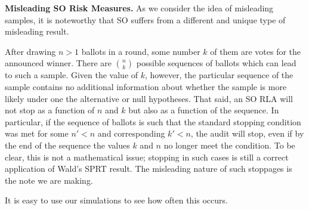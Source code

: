 \textbf{Misleading SO Risk Measures.} As we consider the idea of misleading samples, it is noteworthy that SO \BRAVO suffers from a different and unique type of misleading result. 

After drawing $n>1$ ballots in a round, some number $k$ of them are votes for the announced winner. There are $\binom{n}{k}$ possible sequences of ballots which can lead to such a sample. Given the value of $k$, however, the particular sequence of the sample contains no additional information about whether the sample is more likely under one the alternative or null hypotheses.
That said, an SO \BRAVO RLA will not stop as a function of $n$ and $k$ but also as a function of the sequence. In particular, if the sequence of ballots is such that the standard \BRAVO stopping condition was met for some $n'<n$ and corresponding $k'<n$, the audit will stop, even if by the end of the sequence the values $k$ and $n$ no longer meet the \BRAVO condition. To be clear, this is not a mathematical issue; stopping in such cases is still a correct application of Wald's SPRT result. The misleading nature of such stoppages is the note we are making.

It is easy to use our simulations to see how often this occurs. 



